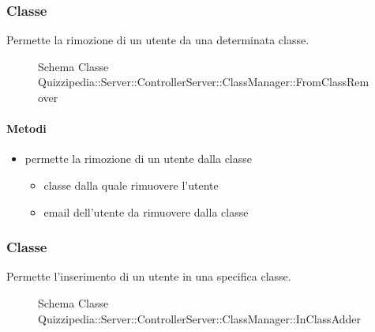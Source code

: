 \subsubsection{Classe }
Permette la rimozione di un utente da una determinata classe.
\begin{figure}[H]
\centering
\noindent{}
\caption[Schema Classe FromClassRemover]{Schema Classe Quizzipedia::Server::ControllerServer::ClassManager::FromClassRemover}
\end{figure}
\paragraph{Metodi}
\begin{itemize}
\item {}
\newline
permette la rimozione di un utente dalla classe
\newline
{}
\newline
\begin{itemize}
\item {}
\newline
classe dalla quale rimuovere l'utente
\item {}
\newline
email dell'utente da rimuovere dalla classe
\end{itemize}
\end{itemize}
\subsubsection{Classe }
Permette l'inserimento di un utente in una specifica classe.
\begin{figure}[H]
\centering
\noindent{}
\caption[Schema Classe InClassAdder]{Schema Classe Quizzipedia::Server::ControllerServer::ClassManager::InClassAdder}
\end{figure}
